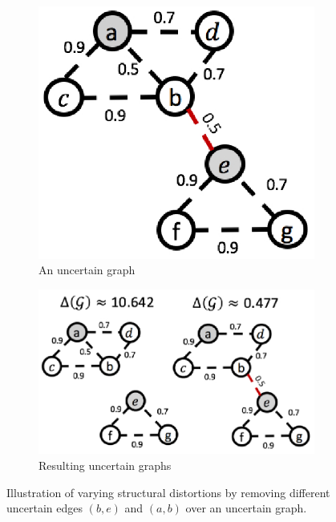 \begin{figure}[!tb]
    \begin{subfigure}[b]{0.45\textwidth}
        \centering
         \includegraphics[scale=0.4]{figures/DegreeAUG/uncertainO.eps}
         \caption{\small{An uncertain graph}}
        \label{fig:edgeBridgeGraph}
    \end{subfigure}
    \begin{subfigure}[b]{0.45\textwidth}
        \centering
         \includegraphics[scale=0.4]{figures/DegreeAUG/uncertainC.eps}
         \caption{\small{Resulting uncertain graphs}}
        \label{fig:edgeRelevance}
     \end{subfigure}
     \caption{Illustration of varying structural distortions by removing different uncertain edges $(b,e)$ and $(a,b)$ over an uncertain graph.}
     \label{fig:edgeRR}
\end{figure}
